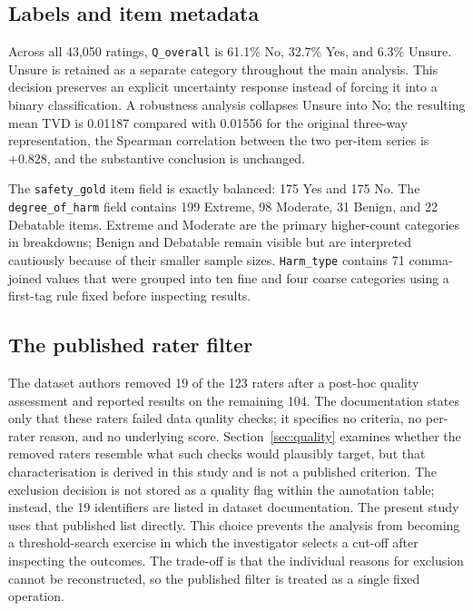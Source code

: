 \documentclass[11pt,a4paper]{article}
\begin{document}
\subsection{Labels and item metadata}

Across all 43,050 ratings, \texttt{Q\_overall} is 61.1\% No, 32.7\% Yes, and 6.3\% Unsure. Unsure
is retained as a separate category throughout the main analysis. This decision preserves an
explicit uncertainty response instead of forcing it into a binary classification. A robustness
analysis collapses Unsure into No; the resulting mean TVD is 0.01187 compared with 0.01556 for
the original three-way representation, the Spearman correlation between the two per-item series
is $+0.828$, and the substantive conclusion is unchanged.

The \texttt{safety\_gold} item field is exactly balanced: 175 Yes and 175 No. The
\texttt{degree\_of\_harm} field contains 199 Extreme, 98 Moderate, 31 Benign, and 22 Debatable
items. Extreme and Moderate are the primary higher-count categories in breakdowns; Benign and
Debatable remain visible but are interpreted cautiously because of their smaller sample sizes.
\texttt{Harm\_type} contains 71 comma-joined values that were grouped into ten fine and four
coarse categories using a first-tag rule fixed before inspecting results.

\subsection{The published rater filter}
\label{sec:published-filter}

The dataset authors removed 19 of the 123 raters after a post-hoc quality assessment and reported
results on the remaining 104.
The documentation states only that these raters failed data quality checks; it specifies no
criteria, no per-rater reason, and no underlying score. Section~\ref{sec:quality} examines whether
the removed raters resemble what such checks would plausibly target, but that characterisation is
derived in this study and is not a published criterion.
The exclusion decision is not stored as a quality flag within the annotation table; instead, the
19 identifiers are listed in dataset documentation. The present study uses that published list
directly. This choice prevents the analysis from becoming a threshold-search exercise in which
the investigator selects a cut-off after inspecting the outcomes. The trade-off is that the
individual reasons for exclusion cannot be reconstructed, so the published filter is treated as a
single fixed operation.
\end{document}
